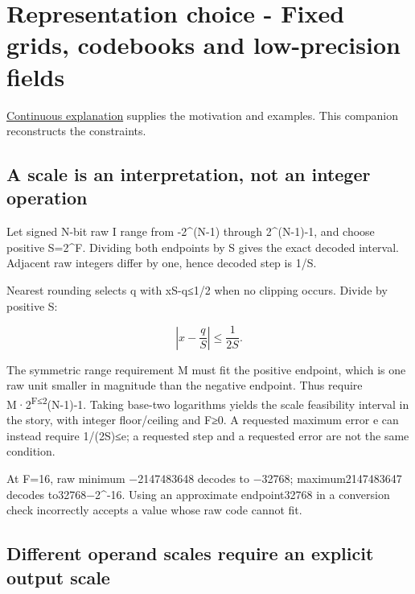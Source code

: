 \section{Representation choice - Fixed grids, codebooks and low-precision fields}\label{01-foundations-i-ch011-representation-choice---fixed-grids-codebooks-and-low-precision-fields}

\hypertarget{01-foundations-i-ch011-representation-choice---fixed-grids-codebooks-and-low-precision-fields}{}

\hyperref[01-foundations-i-ch001-choosing-what-information-to-keep]{Continuous explanation} supplies the motivation and examples. This companion reconstructs the constraints.

\subsection{A scale is an interpretation, not an integer operation}\label{01-foundations-i-ch011-a-scale-is-an-interpretation-not-an-integer-operation}

\hypertarget{01-foundations-i-ch011-a-scale-is-an-interpretation-not-an-integer-operation}{}

Let signed N-bit raw I range from -2\^{}(N-1) through 2\^{}(N-1)-1, and choose positive S=2\^{}F. Dividing both endpoints by S gives the exact decoded interval. Adjacent raw integers differ by one, hence decoded step is 1/S.

Nearest rounding selects q with \textbar xS-q\textbar≤1/2 when no clipping occurs. Divide by positive S:

\[
\left|x-\frac qS\right|\le\frac1{2S}.
\]

The symmetric range requirement M must fit the positive endpoint, which is one raw unit smaller in magnitude than the negative endpoint. Thus require M·2\textsuperscript{F≤2}(N-1)-1. Taking base-two logarithms yields the scale feasibility interval in the story, with integer floor/ceiling and F≥0. A requested maximum error e can instead require 1/(2S)≤e; a requested step and a requested error are not the same condition.

At F=16, raw minimum −2147483648 decodes to −32768; maximum2147483647 decodes to32768−2\^{}-16. Using an approximate endpoint32768 in a conversion check incorrectly accepts a value whose raw code cannot fit.

\subsection{Different operand scales require an explicit output scale}\label{01-foundations-i-ch011-different-operand-scales-require-an-explicit-output-scale}

